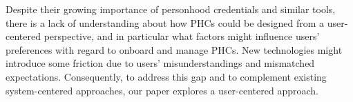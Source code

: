 
Despite their growing importance
of personhood credentials and similar tools, there is a lack of understanding about how PHCs could be designed
from a user-centered perspective, and in particular what factors might influence users' preferences with regard to onboard and manage PHCs. New technologies might introduce some friction due to users’ misunderstandings and mismatched expectations. Consequently, to address this gap and to
complement existing system-centered approaches, our paper
explores a user-centered approach. 

